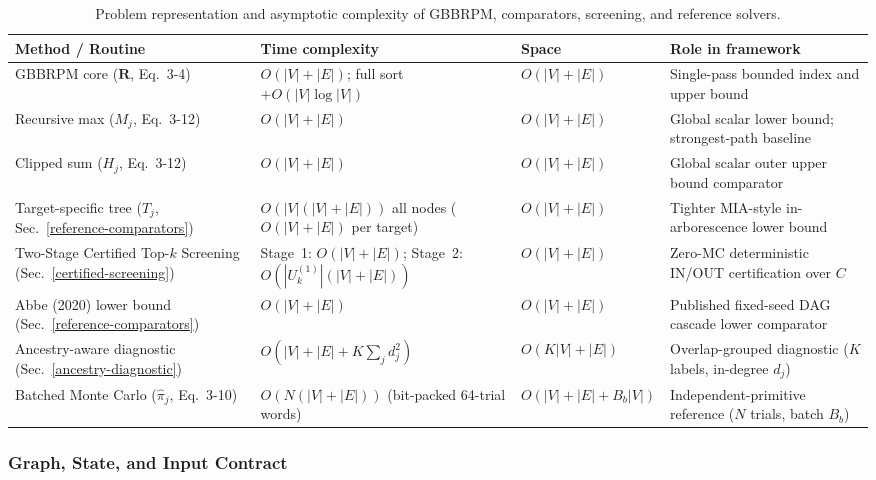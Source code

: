 \begin{table}[htbp]
\centering
\caption{Problem representation and asymptotic complexity of GBBRPM, comparators, screening, and reference solvers.}
\label{tab:complexity-summary}
\footnotesize
\setlength{\tabcolsep}{4pt}
\renewcommand{\arraystretch}{1.15}
\begin{tabularx}{\textwidth}{@{}>{\raggedright\arraybackslash}p{3.4cm} >{\raggedright\arraybackslash}p{3.4cm} >{\raggedright\arraybackslash}p{2.3cm} L@{}}
\toprule
Method / Routine & Time complexity & Space & Role in framework\\
\midrule
GBBRPM core ($\mathbf{R}$, Eq.~3-4) & $O(|V|+|E|)$; full sort $+O(|V|\log|V|)$ & $O(|V|+|E|)$ & Single-pass bounded index and upper bound\\
Recursive max ($M_j$, Eq.~3-12) & $O(|V|+|E|)$ & $O(|V|+|E|)$ & Global scalar lower bound; strongest-path baseline\\
Clipped sum ($H_j$, Eq.~3-12) & $O(|V|+|E|)$ & $O(|V|+|E|)$ & Global scalar outer upper bound comparator\\
Target-specific tree ($T_j$, Sec.~\ref{reference-comparators}) & $O(|V|(|V|+|E|))$ all nodes ($O(|V|+|E|)$ per target) & $O(|V|+|E|)$ & Tighter MIA-style in-arborescence lower bound\\
Two-Stage Certified Top-$k$ Screening (Sec.~\ref{certified-screening}) & Stage~1: $O(|V|+|E|)$; Stage~2: $O(|U_k^{(1)}|(|V|+|E|))$ & $O(|V|+|E|)$ & Zero-MC deterministic IN/OUT certification over $C$\\
Abbe (2020) lower bound (Sec.~\ref{reference-comparators}) & $O(|V|+|E|)$ & $O(|V|+|E|)$ & Published fixed-seed DAG cascade lower comparator\\
Ancestry-aware diagnostic (Sec.~\ref{ancestry-diagnostic}) & $O(|V|+|E|+K\sum_j d_j^2)$ & $O(K|V|+|E|)$ & Overlap-grouped diagnostic ($K$ labels, in-degree $d_j$)\\
Batched Monte Carlo ($\widehat{\pi}_j$, Eq.~3-10) & $O(N(|V|+|E|))$ (bit-packed 64-trial words) & $O(|V|+|E|+B_b|V|)$ & Independent-primitive reference ($N$ trials, batch $B_b$)\\
\bottomrule
\end{tabularx}
\end{table}

\subsubsection{Graph, State, and Input Contract}\label{input-contract}

